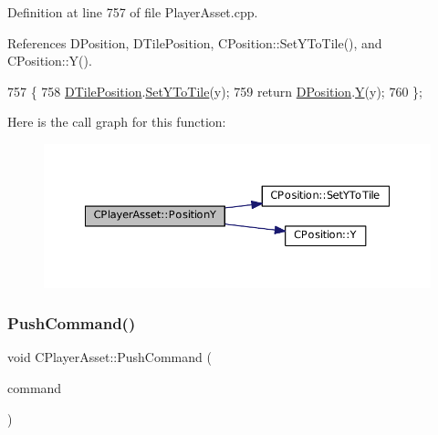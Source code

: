 Definition at line 757 of file Player\+Asset.\+cpp.



References D\+Position, D\+Tile\+Position, C\+Position\+::\+Set\+Y\+To\+Tile(), and C\+Position\+::\+Y().


\begin{DoxyCode}
757                                 \{
758     \hyperlink{classCPlayerAsset_a5b59a9d3b7db8c7fa194b80dafb96186}{DTilePosition}.\hyperlink{classCPosition_a5805485f623398197ac595a5d389f691}{SetYToTile}(y);
759     \textcolor{keywordflow}{return} \hyperlink{classCPlayerAsset_aa9f53c009b181c7c5647c6b03776a04c}{DPosition}.\hyperlink{classCPosition_a1aa8a30e2f08dda1f797736ba8c13a87}{Y}(y);
760 \};
\end{DoxyCode}
Here is the call graph for this function\+:\nopagebreak
\begin{figure}[H]
\begin{center}
\leavevmode
\includegraphics[width=350pt]{classCPlayerAsset_a497fe719ca97252f0ee7985e0e30518e_cgraph}
\end{center}
\end{figure}
\hypertarget{classCPlayerAsset_ab7421ec7906d36f028484ff518cc3c90}{}\label{classCPlayerAsset_ab7421ec7906d36f028484ff518cc3c90} 
\subsubsection{\texorpdfstring{Push\+Command()}{PushCommand()}}
{\footnotesize\ttfamily void C\+Player\+Asset\+::\+Push\+Command (\begin{DoxyParamCaption}\item[{const \hyperlink{structSAssetCommand}{S\+Asset\+Command} \&}]{command }\end{DoxyParamCaption})\hspace{0.3cm}{\ttfamily [inline]}}



